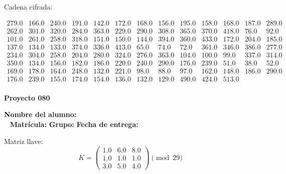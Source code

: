 \documentclass[12pt]{article}
\begin{document}
Cadena cifrada:
\begin{center}
$\begin{array}{lllllllllllll}
279.0 & 166.0 & 240.0 & 191.0 & 142.0 & 172.0 & 168.0 & 156.0 & 195.0 & 158.0 & 168.0 & 187.0 & 289.0\\
262.0 & 301.0 & 320.0 & 284.0 & 363.0 & 229.0 & 290.0 & 308.0 & 365.0 & 370.0 & 418.0 & 76.0 & 92.0\\
101.0 & 261.0 & 258.0 & 318.0 & 151.0 & 150.0 & 144.0 & 394.0 & 360.0 & 433.0 & 172.0 & 204.0 & 185.0\\
137.0 & 134.0 & 133.0 & 374.0 & 336.0 & 413.0 & 65.0 & 74.0 & 72.0 & 361.0 & 346.0 & 386.0 & 277.0\\
234.0 & 304.0 & 258.0 & 204.0 & 280.0 & 324.0 & 276.0 & 363.0 & 104.0 & 100.0 & 99.0 & 337.0 & 314.0\\
350.0 & 134.0 & 156.0 & 182.0 & 186.0 & 220.0 & 240.0 & 290.0 & 176.0 & 239.0 & 51.0 & 38.0 & 52.0\\
169.0 & 178.0 & 164.0 & 248.0 & 132.0 & 221.0 & 98.0 & 88.0 & 97.0 & 162.0 & 148.0 & 186.0 & 290.0\\
176.0 & 239.0 & 155.0 & 174.0 & 154.0 & 136.0 & 132.0 & 129.0 & 490.0 & 424.0 & 513.0\\
\end{array}$
\end{center}

\newpage


\textbf{Proyecto 080}

\textbf{Nombre del alumno:} \underline{\hspace{13cm}}\\\
\vspace{1cm}
\textbf{Matrícula:} \underline{\hspace{4cm}} \hspace{1cm}
\textbf{Grupo:} \underline{\hspace{2cm}}
\textbf{Fecha de entrega:} \underline{\hspace{2cm}}

\medskip

Matriz llave:
\[
K = \begin{pmatrix}
1.0 & 6.0 & 8.0\\
1.0 & 1.0 & 1.0\\
3.0 & 5.0 & 4.0
\end{pmatrix} \pmod{29}
\]
\end{document}
